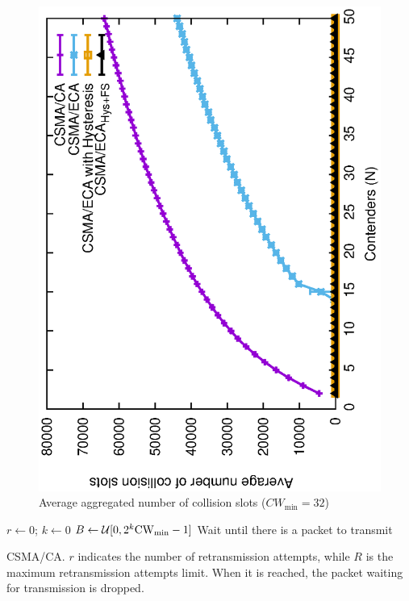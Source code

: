 	\begin{figure}[tb]
	\centering
		\includegraphics[width=0.7\linewidth, angle=-90]{figures/collisions-perfectChannel.eps}
		\caption{Average aggregated number of collision slots ($CW_{\min}=32$)\cite{sanabria2014high}}
		\label{fig:col-CAvsECA}
	\end{figure}

	\begin{algorithm}[t]
	{
	  $r \leftarrow 0$; $k \leftarrow 0$\;
	  $B \leftarrow \mathcal{U}[0,2^k{\rm{CW}_{min}}-1]$\;
	  Wait until there is a packet to transmit\;
	}
	\caption{\small{CSMA/CA. $r$ indicates the number of retransmission attempts, while $R$ is the maximum retransmission attempts limit. When it is reached, the packet waiting for transmission is dropped.}}
	\label{alg:DCF}
	\end{algorithm}

